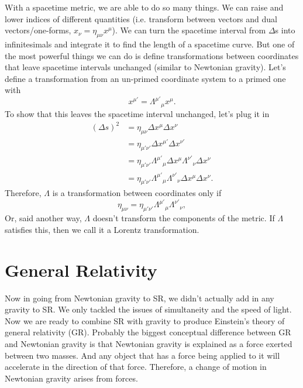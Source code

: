 \begin{bibunit}[unsrtnat]
With a spacetime metric, we are able to do so many things. We can raise and
lower indices of different quantities (i.e. transform between vectors and dual
vectors/one-forms, $x_\nu = \eta_{\mu\nu}x^\mu$). We can turn the spacetime
interval from $\Delta$s into infinitesimals and integrate it to find the length
of a spacetime curve. But one of the most powerful things we can do is define
transformations between coordinates that leave spacetime intervals unchanged
(similar to Newtonian gravity).
Let's define a transformation from an un-primed coordinate system to a primed one
with
\begin{equation}
   x^{\mu'} = {\Lambda^{\mu'}}_{\mu} x^\mu .
\end{equation}
To show that this leaves the spacetime interval unchanged, let's plug it in
\begin{align}
   (\Delta s)^2 &= \eta_{\mu\nu}\Delta x^\mu\Delta x^\nu \nonumber\\
   &= \eta_{{\mu'}{\nu'}}\Delta x^{\mu'}\Delta x^{\nu'} \nonumber\\
   &= \eta_{{\mu'}{\nu'}}{\Lambda^{\mu'}}_{\mu}\Delta x^{\mu}{\Lambda^{\nu'}}_{\nu}\Delta x^{\nu} \nonumber\\
   &= \eta_{{\mu'}{\nu'}}{\Lambda^{\mu'}}_{\mu}{\Lambda^{\nu'}}_{\nu}\Delta x^{\mu}\Delta x^{\nu}.
\end{align}
Therefore, $\Lambda$ is a transformation between coordinates only if
\begin{equation}
   \eta_{\mu\nu} = \eta_{{\mu'}{\nu'}}{\Lambda^{\mu'}}_{\mu}{\Lambda^{\nu'}}_{\nu},
\end{equation}
Or, said another way, $\Lambda$ doesn't transform the components of the metric.
If $\Lambda$ satisfies this, then we call it a Lorentz transformation.

\section{General Relativity}
Now in going from Newtonian gravity to SR, we didn't actually add in any gravity
to SR. We only tackled the issues of simultaneity and the speed of light. Now we
are ready to combine SR with gravity to produce Einstein's theory of general
relativity (GR). Probably the biggest conceptual difference between GR and
Newtonian gravity is that Newtonian gravity is explained as a force exerted
between two masses. And any object that has a force being applied to it will
accelerate in the direction of that force. Therefore, a change of motion in
Newtonian gravity arises from forces.


\end{bibunit}
